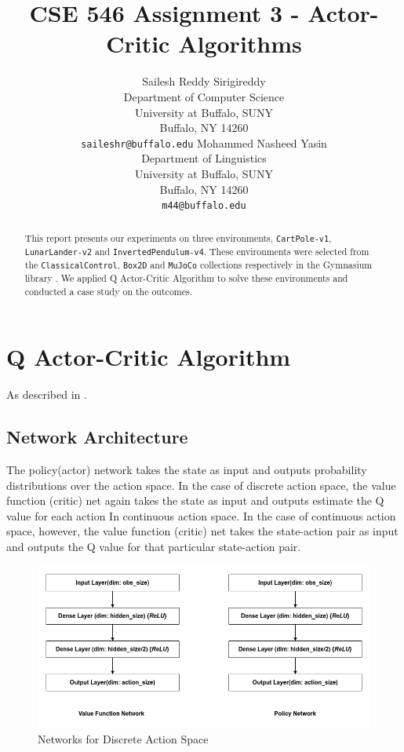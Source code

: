 \documentclass{article} %
\title{CSE 546 Assignment 3 - Actor-Critic Algorithms}
\author{
   Sailesh Reddy Sirigireddy\\
   Department of Computer Science\\
   University at Buffalo, SUNY\\
   Buffalo, NY 14260 \\
   \texttt{saileshr@buffalo.edu}
   \And
   Mohammed Nasheed Yasin \\
   Department of Linguistics\\
   University at Buffalo, SUNY\\
   Buffalo, NY 14260 \\
   \texttt{m44@buffalo.edu}
}
\begin{document}
\maketitle

\begin{abstract}
    This report presents our experiments on three environments, \verb|CartPole-v1|, \verb|LunarLander-v2| and \verb|InvertedPendulum-v4|. These environments were selected from the \verb|ClassicalControl|, \verb|Box2D| and \verb|MuJoCo| collections respectively in the Gymnasium library \cite{1606.01540}. We applied Q Actor-Critic Algorithm to solve these environments and conducted a case study on the outcomes.
\end{abstract}


\section{Q Actor-Critic Algorithm}

As described in \cite{NIPS1994_23ce1851}.

\subsection{Network Architecture}
The policy(actor) network takes the state as input and outputs probability distributions over the action space. In the case of discrete action space, the value function (critic) net again takes the state as input and outputs estimate the Q value for each action In continuous action space. In the case of continuous action space, however, the value function (critic) net takes the state-action pair as input and outputs the Q value for that particular state-action pair.

\begin{figure}[H]
    \begin{center}
        \includegraphics[width=\textwidth]{discrete.png}
    \end{center}
    \caption{Networks for Discrete Action Space}
\end{figure}
\end{document}
